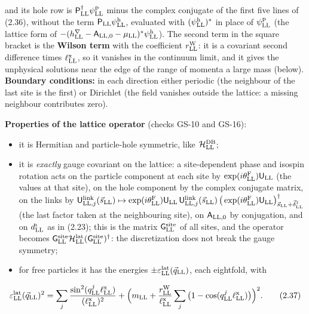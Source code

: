 \documentclass[
  10pt,
]{article}
\providecommand{\tightlist}{%
  \setlength{\itemsep}{0pt}\setlength{\parskip}{0pt}}
\begin{document}
and its hole row is \(\mathsf P^\dagger_{\rm LL}\psi^{\rm p}_{\rm LL}\)
minus the complex conjugate of the first five lines of (2.36), without
the term \(\mathsf P_{\rm LL}\psi^{\rm h}_{\rm LL}\), evaluated with
\((\psi^{\rm h}_{\rm LL})^*\) in place of \(\psi^{\rm p}_{\rm LL}\) (the
lattice form of
\(-(h^\nabla_{\rm LL}-\mathsf A_{{\rm LL},0}-\mu_{\rm LL})^*\psi^{\rm h}_{\rm LL}\)).
The second term in the square bracket is the \textbf{Wilson term} with
the coefficient \(r^{\rm W}_{\rm LL}\): it is a covariant second
difference times \(\ell^{\rm x}_{\rm LL}\), so it vanishes in the
continuum limit, and it gives the unphysical solutions near the edge of
the range of momenta a large mass (below). \textbf{Boundary conditions:}
in each direction either periodic (the neighbour of the last site is the
first) or Dirichlet (the field vanishes outside the lattice: a missing
neighbour contributes zero).

\textbf{Properties of the lattice operator} (checks GS-10 and GS-16):

\begin{itemize}
\tightlist
\item
  it is Hermitian and particle-hole symmetric, like
  \(\mathcal H^{\rm DB}_{\rm LL}\);
\item
  it is \emph{exactly} gauge covariant on the lattice: a site-dependent
  phase and isospin rotation acts on the particle component at each site
  by \(\exp(i\theta^{\rm F}_{\rm LL})\mathsf U_{\rm LL}\) (the values at
  that site), on the hole component by the complex conjugate matrix, on
  the links by
  \(\mathsf U^{\rm link}_{{\rm LL},j}(\vec s_{\rm LL})\mapsto\exp(i\theta^{\rm F}_{\rm LL})\mathsf U_{\rm LL}\,\mathsf U^{\rm link}_{{\rm LL},j}(\vec s_{\rm LL})\,\big(\exp(i\theta^{\rm F}_{\rm LL})\mathsf U_{\rm LL}\big)^\dagger_{\vec s_{\rm LL}+\vec\delta^j_{\rm LL}}\)
  (the last factor taken at the neighbouring site), on
  \(\mathsf A_{{\rm LL},0}\) by conjugation, and on \(d^\iota_{\rm LL}\)
  as in (2.23); this is the matrix \(\mathsf G^{\rm site}_{\rm LL}\) of
  all sites, and the operator becomes
  \(\mathsf G^{\rm site}_{\rm LL}\mathcal H^{\rm lat}_{\rm LL}(\mathsf G^{\rm site}_{\rm LL})^\dagger\):
  the discretization does not break the gauge symmetry;
\item
  for free particles it has the energies
  \(\pm\varepsilon^{\rm lat}_{\rm LL}(\vec q_{\rm LL})\), each
  eightfold, with
\end{itemize}

\[\varepsilon^{\rm lat}_{\rm LL}(\vec q_{\rm LL})^2=\sum_j\frac{\sin^2(q^j_{\rm LL}\ell^{\rm x}_{\rm LL})}{(\ell^{\rm x}_{\rm LL})^2}+\Big(m_{\rm LL}+\frac{r^{\rm W}_{\rm LL}}{\ell^{\rm x}_{\rm LL}}\sum_j\big(1-\cos(q^j_{\rm LL}\ell^{\rm x}_{\rm LL})\big)\Big)^2.\tag{2.37}\]
\end{document}
